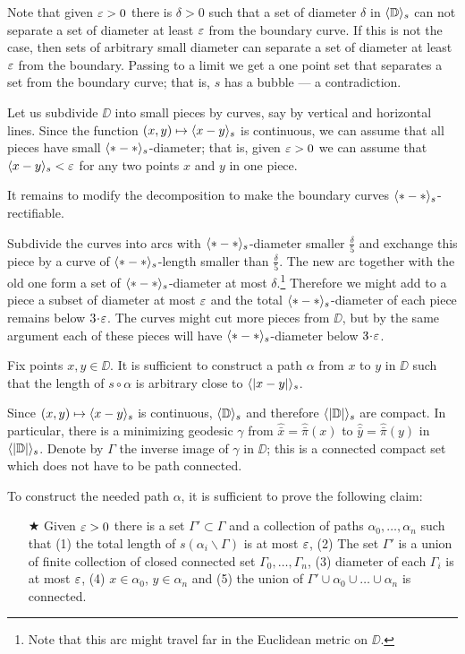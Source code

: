Note that given $\varepsilon>0$ there is $\delta>0$ such that a set of diameter $\delta$ in $\langle\mathbb{D}\rangle_s$ can not separate a set of diameter at least $\varepsilon$ from the boundary curve.
If this is not the case, 
then sets of arbitrary small diameter can separate a set of diameter at least $\varepsilon$ from the boundary.
Passing to a limit we get a one point set that separates a set from the boundary curve; that is, $s$ has a bubble --- a contradiction. 

Let us subdivide $\DD$ into small pieces by curves, say by vertical and horizontal lines.
Since the function $(x,y)\mapsto \langle x-y\rangle_s$ is continuous,
we can assume that all pieces have small $\langle{*}-{*}\rangle_s$-diameter;
that is, given $\varepsilon>0$ we can assume that $\langle x-y\rangle_s<\varepsilon$ for any two points $x$ and $y$ in one piece.

It remains to modify the decomposition to make the boundary curves $\langle{*}-{*}\rangle_s$-rectifiable.

Subdivide the curves into arcs with $\langle{*}-{*}\rangle_s$-diameter smaller $\tfrac{\delta}{5}$ and exchange this piece by a curve of $\langle{*}-{*}\rangle_s$-length smaller than $\tfrac{\delta}{5}$.
The new arc together with the old one form a set of  $\langle{*}-{*}\rangle_s$-diameter at most $\delta$.\footnote{Note that this arc might travel far in the Euclidean metric on $\DD$.}
Therefore we might add to a piece a subset of diameter at most $\varepsilon$ and the total $\langle{*}-{*}\rangle_s$-diameter of each piece remains below $3\cdot\eps$.
The curves might cut more pieces from $\DD$, but by the same argument each of these pieces will have $\langle{*}-{*}\rangle_s$-diameter below $3\cdot\eps$.
\qeds

Fix points $x,y\in \DD$.
It is sufficient to construct a path $\alpha$ from $x$ to $y$ in $\DD$ such that the length of $s\circ\alpha$ is arbitrary close to $\langle|x-y|\rangle_s$.

Since $(x,y)\mapsto \langle x-y\rangle_s$ is continuous, $\langle\mathbb{D}\rangle_s$ and therefore $\langle|\mathbb{D}|\rangle_s$ are compact.
In particular, there is a minimizing geodesic $\gamma$ from $\hat{\bar x}=\hat{\bar \pi}(x)$ to $\hat{\bar y}=\hat{\bar \pi}(y)$ in $\langle|\mathbb{D}|\rangle_s$.
Denote by $\Gamma$ the inverse image of $\gamma$ in $\DD$;
this is a connected compact set which does not have to be path connected.

To construct the needed path $\alpha$, it is sufficient to prove the following claim:

\begin{itemize}
 \item[$\bigstar$] Given $\varepsilon>0$ there is a set $\Gamma'\subset \Gamma$ 
 and a collection of paths $\alpha_0,\dots,\alpha_n$ such that 
 (1) the total length of $s(\alpha_i\backslash\Gamma)$ is at most $\varepsilon$, 
 (2) The set $\Gamma'$ is a union of finite collection of closed connected set $\Gamma_0,\dots,\Gamma_n$, 
 (3) diameter of each $\Gamma_i$ is at most $\varepsilon$, 
 (4) $x\in\alpha_0$, $y\in\alpha_n$ and 
 (5) the union of $\Gamma'\cup \alpha_0\cup\dots\cup\alpha_n$ is connected.
\end{itemize}

